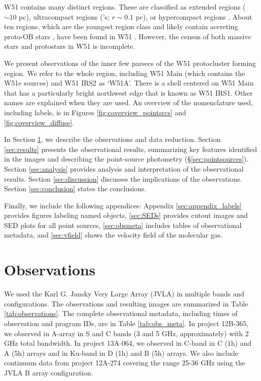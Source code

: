 W51 contains many distinct \hii regions.  These are classified as extended
\hii regions ($\sim10$ pc), ultracompact \hii regions
(\uchii's; $r\sim0.1$ pc), or hypercompact \hii regions \citep[\hchii's;
$r<0.05$ pc][]{Kurtz2002a}.  About ten \hchii regions, which are the
youngest \hii region class and likely contain accreting proto-OB stars
\citep{Peters2010c}, have been found in W51 \citep{Mehringer1994a}.  However,
the census of both massive stars and protostars in W51 is incomplete.

We present observations of the inner few parsecs of the W51 protocluster
forming region.  We refer to the whole region, including W51 Main (which
contains the W51e sources) and W51 IRS2 as `W51A'.  There is a shell
centered on W51 Main that has a particularly bright northwest edge that is 
known as W51 IRS1.  Other names are explained
when they are used.  An overview of the nomenclature used, including labels, is
in Figures \ref{fig:coverview_pointsrcs} and \ref{fig:coverview_diffuse}.

In Section \ref{sec:observations}, we describe the observations and data
reduction.  Section \ref{sec:results} presents the observational results,
summarizing key features identified in the images and describing the
point-source photometry (\S \ref{sec:pointsources}).  Section
\ref{sec:analysis} provides analysis and interpretation of the observational
results.  Section \ref{sec:discussion} discusses the implications of the
observations.  Section \ref{sec:conclusion} states the conclusions.

Finally, we include the following appendices: Appendix
\ref{sec:appendix_labels} provides figures labeling named objects,
\ref{sec:SEDs} provides cutout images and SED plots for all point sources,
\ref{sec:obsmeta} includes tables of observational metadata, and
\ref{sec:vfield} shows the velocity field of the molecular gas.


\section{Observations}
\label{sec:observations}
We used the Karl G. Jansky Very Large Array (JVLA) in multiple bands and
configurations. 
The observations and resulting images are summarized in Table
\ref{tab:observations}.  The complete observational metadata, including times
of observation and program IDs, are in Table \ref{tab:obs_meta}.  In project
12B-365, we observed in A-array in S and C bands (3 and 5 GHz, approximately)
with 2 GHz total bandwidth.
In project 13A-064, we observed in C-band in C (1h) and A (5h) arrays and in
Ku-band in D (1h) and B (5h) arrays.
We also include continuum data from project 12A-274
\citep{Goddi2015a,Goddi2016a} covering the range 25-36 GHz using the JVLA B
array configuration.  

